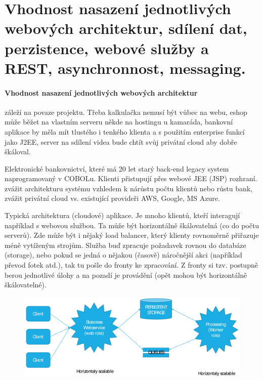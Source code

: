 \section[WA2 - Web. architektury, perzistence, WS, messaging]{Vhodnost nasazení jednotlivých webových architektur, sdílení dat, perzistence, webové služby a REST, asynchronnost, messaging.}

\paragraph{Vhodnost nasazení jednotlivých webových architektur} záleží na povaze projektu. Třeba kalkulačka nemusí být vůbec na webu, eshop může běžet na vlastním serveru někde na hostingu u kamaráda, bankovní aplikace by měla mít tlustého i tenkého klienta a s použitím enterprise funkcí jako J2EE, server na sdílení videa bude chtít svůj privátní cloud aby dobře škáloval.

\priklad Elektronické bankovnictví, které má 20 let starý back-end legacy system naprogramovaný v COBOLu. Klienti přistupují přes webové JEE (JSP) rozhraní. zvážit architekturu systému vzhledem k nárůstu počtu klientů nebo růstu bank, zvážit privátní cloud vs. existující provideři AWS, Google, MS Azure.

Typická architektura (cloudové) aplikace. Je mnoho klientů, kteří interagují například s webovou službou. Ta může být horizontálně škálovatelná (co do počtu serverů). Zde může být i nějaký load balancer, který klienty rovnoměrně přiřazuje méně vytíženým strojům. Služba buď zpracuje požadavek rovnou do databáze (storage), nebo pokud se jedná o nějakou (časově) náročnější akci (například převod fotek atd.), tak tu pošle do fronty ke zpracování. Z fronty si tzv.  postupně berou jednotlivé úlohy a na pozadí je provádění (opět mohou být horizontálně škálovatelné).

\begin{figure}[h!]
\centering
\includegraphics[width=130mm]{17/images/cloud-architecture}
\end{figure}

